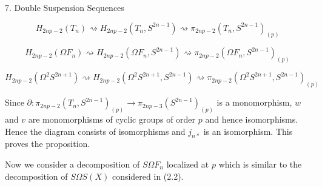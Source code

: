 7. Double Suspension Sequences

$$H_{2np-2}(T_n) \rightsquigarrow H_{2np-2}(T_n, S^{2n-1}) \rightsquigarrow \pi_{2np-2}(T_n, S^{2n-1})_{(p)}$$

$$H_{2np-2}(\Omega F_n) \rightsquigarrow H_{2np-2}(\Omega F_n, S^{2n-1}) \rightsquigarrow \pi_{2np-2}(\Omega F_n, S^{2n-1})_{(p)}$$

$$H_{2np-2}(\Omega^2 S^{2n+1}) \rightsquigarrow H_{2np-2}(\Omega^2 S^{2n+1}, S^{2n-1}) \rightsquigarrow \pi_{2np-2}(\Omega^2 S^{2n+1}, S^{2n-1})_{(p)}$$

Since $\partial: \pi_{2np-2}(T_n, S^{2n-1})_{(p)} \rightarrow \pi_{2np-3}(S^{2n-1})_{(p)}$ is a monomorphism, $w$ and $v$ are monomorphisms of cyclic groups of order $p$ and hence isomorphisms. Hence the diagram consists of isomorphisms and $j_{n*}$ is an isomorphism. This proves the proposition.

Now we consider a decomposition of $S\Omega F_n$ localized at $p$ which is similar to the decomposition of $S\Omega S(X)$ considered in (2.2).
